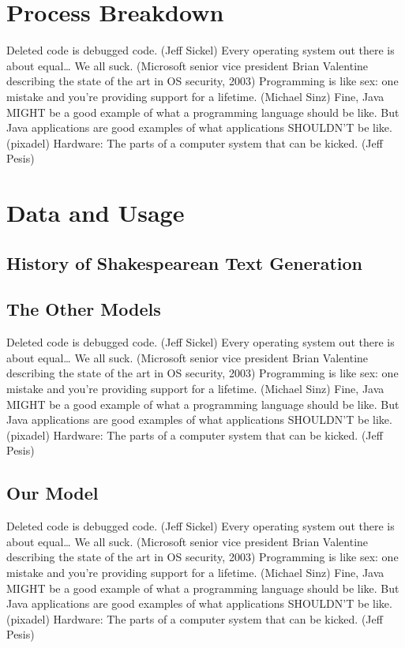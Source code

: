 \documentclass[11pt,a4paper]{article}
\begin{document}
\section{Process Breakdown}
\label{sec:process}
Deleted code is debugged code. (Jeff Sickel) Every operating system out there is about equal… We all suck. (Microsoft senior vice president Brian Valentine describing the state of the art in OS security, 2003) Programming is like sex: one mistake and you’re providing support for a lifetime. (Michael Sinz) Fine, Java MIGHT be a good example of what a programming language should be like. But Java applications are good examples of what applications SHOULDN’T be like. (pixadel) Hardware: The parts of a computer system that can be kicked. (Jeff Pesis)

\section{Data and Usage}

\subsection{History of Shakespearean Text Generation}
\label{sec:history}





\subsection{The Other Models}
\label{sec:others}
Deleted code is debugged code. (Jeff Sickel) Every operating system out there is about equal… We all suck. (Microsoft senior vice president Brian Valentine describing the state of the art in OS security, 2003) Programming is like sex: one mistake and you’re providing support for a lifetime. (Michael Sinz) Fine, Java MIGHT be a good example of what a programming language should be like. But Java applications are good examples of what applications SHOULDN’T be like. (pixadel) Hardware: The parts of a computer system that can be kicked. (Jeff Pesis)

\subsection{Our Model}
\label{sec:ours}

Deleted code is debugged code. (Jeff Sickel) Every operating system out there is about equal… We all suck. (Microsoft senior vice president Brian Valentine describing the state of the art in OS security, 2003) Programming is like sex: one mistake and you’re providing support for a lifetime. (Michael Sinz) Fine, Java MIGHT be a good example of what a programming language should be like. But Java applications are good examples of what applications SHOULDN’T be like. (pixadel) Hardware: The parts of a computer system that can be kicked. (Jeff Pesis)
\end{document}
